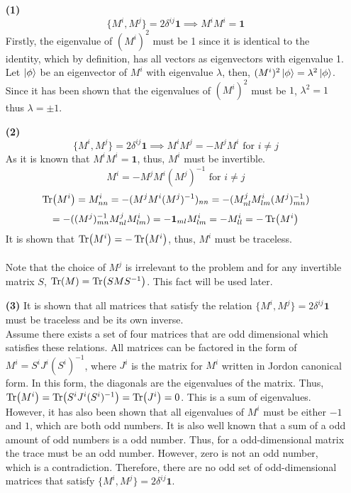 \begin{sol}
\begin{enumerate}
\item[\textbf{(1)}]
\begin{equation}
	\{M^i,M^j\}=2\delta^{ij}\mathbf{1}\implies M^iM^i=\mathbf{1}
\end{equation}  
Firstly, the eigenvalue of $(M^i)^2$ must be 1 since it is identical to the identity, which by definition, has all vectors as eigenvectors with eigenvalue 1. 
Let $\ket\phi$ be an eigenvector of $M^i$ with eigenvalue $\lambda$, then, $(M^i)^2\ket\phi=\lambda^2\ket\phi$. Since it has been shown that the eigenvalues of $(M^i)^2$ must be $1$, $\lambda^2=1$ thus $\lambda=\pm 1$.
\item[\textbf{(2)}]
\begin{equation}
	\{M^i,M^j\}=2\delta^{ij}\mathbf{1}\implies M^iM^j=-M^jM^i\text{ for }i\neq j
\end{equation}
As it is known that $M^iM^i=\mathbf{1}$, thus, $M^i$ must be invertible.
\begin{equation}
	M^i=-M^jM^i(M^j)^{-1}\text{ for }i\neq j
\end{equation}
\begin{equation}
	\Tr(M^i)=M^i_{nn}=-(M^jM^i(M^j)^{-1})_{nn}=-(M^j_{nl}M^i_{lm}(M^j)^{-1}_{mn})
\end{equation}
\begin{equation}
	=-((M^j)^{-1}_{mn}M^j_{nl}M^i_{lm})=-\mathbf 1_{ml}M^i_{lm}=-M^i_{ll}=-\Tr(M^i)
\end{equation}
It is shown that $\Tr(M^i)=-\Tr(M^i)$, thus, $M^i$ must be traceless.\\\\Note that the choice of $M^j$ is irrelevant to the problem and for any invertible matrix $S$, $\Tr(M)=\Tr(SMS^{-1})$. This fact will be used later.
\item[\textbf{(3)}]
It is shown that all matrices that satisfy the relation $\{M^i,M^j\}=2\delta^{ij}\mathbf{1}$ must be traceless and be its own inverse.\\
Assume there exists a set of four matrices that are odd dimensional which satisfies these relations. All matrices can be factored in the form of $M^i=S^iJ^i(S^i)^{-1}$, where $J^i$ is the matrix for $M^i$ written in Jordon canonical form. In this form, the diagonals are the eigenvalues of the matrix. Thus, $\Tr(M^i)=\Tr(S^iJ^i(S^i)^{-1})=\Tr(J^i)=0$. This is a sum of eigenvalues. However, it has also been shown that all eigenvalues of $M^i$ must be either $-1$ and $1$, which are both odd numbers. It is also well known that a sum of a odd amount of odd numbers is a odd number. Thus, for a odd-dimensional matrix the trace must be an odd number. However, zero is not an odd number, which is a contradiction. Therefore, there are no odd set of odd-dimensional matrices that satisfy $\{M^i,M^j\}=2\delta^{ij}\mathbf{1}$.
\end{enumerate}
\end{sol}